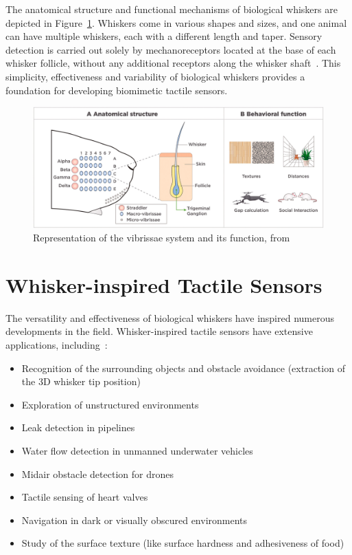 The anatomical structure and functional mechanisms of biological whiskers are depicted in Figure~\ref{fig:whisker-anatomy}.
Whiskers come in various shapes and sizes, and one animal can have multiple whiskers, each with a different length and taper.
Sensory detection is carried out solely by mechanoreceptors located at the base of each whisker follicle, without any additional receptors along the whisker shaft~\cite{doi:10.1089/soro.2016.0028}.
This simplicity, effectiveness and variability of biological whiskers provides a foundation for developing biomimetic tactile sensors.

\begin{figure}[htb]
    \centering
    \includegraphics[width=\textwidth]{figures/whisker-anatomy}
    \caption{Representation of the vibrissae system and its function, from~\cite{IBARRACASTANEDA2022100034}}
    \label{fig:whisker-anatomy}
\end{figure}


\section{Whisker-inspired Tactile Sensors}

The versatility and effectiveness of biological whiskers have inspired numerous developments in the field.
Whisker-inspired tactile sensors have extensive applications, including~\cite{s22072705}:
\begin{itemize}
    \item Recognition of the surrounding objects and obstacle avoidance (extraction of the 3D whisker tip position)
    \item Exploration of unstructured environments
    \item Leak detection in pipelines
    \item Water flow detection in unmanned underwater vehicles
    \item Midair obstacle detection for drones
    \item Tactile sensing of heart valves
    \item Navigation in dark or visually obscured environments
    \item Study of the surface texture (like surface hardness and adhesiveness of food)~\cite{https://doi.org/10.1002/aisy.202300660}
\end{itemize}

